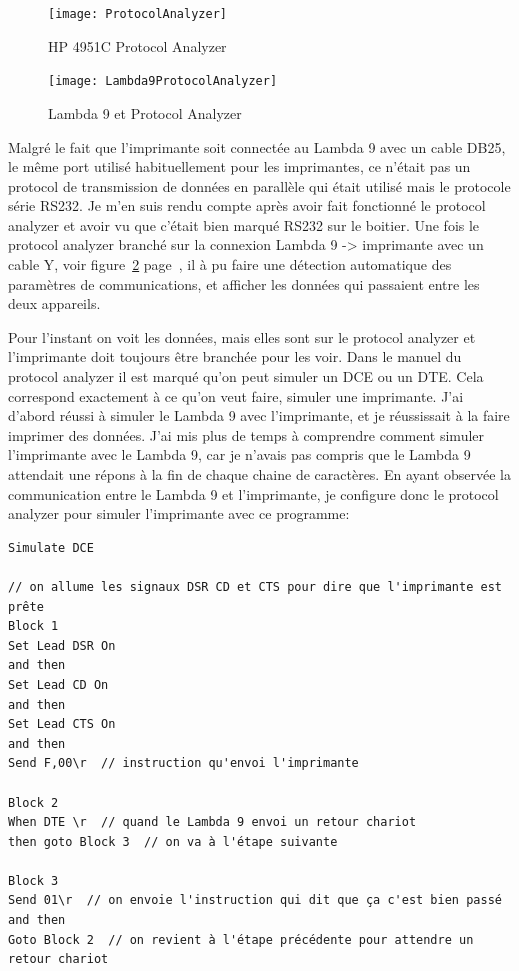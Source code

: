 \documentclass[12pt]{article}
\begin{document}
\begin{figure}[h]
	\centering
	\texttt{[image: ProtocolAnalyzer]}
	\caption{HP 4951C Protocol Analyzer}
	\label{fig:protocolAnalyzer}
\end{figure}

\begin{figure}[h]
	\centering
	\texttt{[image: Lambda9ProtocolAnalyzer]}
	\caption{Lambda 9 et Protocol Analyzer}
	\label{fig:lambda9HP}
\end{figure}


Malgré le fait que l'imprimante soit connectée au Lambda 9 avec un cable DB25, le même port utilisé habituellement pour les imprimantes, ce n'était pas un protocol de transmission de données en parallèle qui était utilisé mais le protocole série RS232.
Je m'en suis rendu compte après avoir fait fonctionné le protocol analyzer et avoir vu que c'était bien marqué RS232 sur le boitier.
Une fois le protocol analyzer branché sur la connexion Lambda 9 -> imprimante avec un cable Y, voir figure~\ref{fig:lambda9HP} page~\pageref{fig:lambda9HP}, il à pu faire une détection automatique des paramètres de communications, et afficher les données qui passaient entre les deux appareils.

Pour l'instant on voit les données, mais elles sont sur le protocol analyzer et l'imprimante doit toujours être branchée pour les voir.
Dans le manuel du protocol analyzer il est marqué qu'on peut simuler un DCE ou un DTE.
Cela correspond exactement à ce qu'on veut faire, simuler une imprimante.
J'ai d'abord réussi à simuler le Lambda 9 avec l'imprimante, et je réussissait à la faire imprimer des données.
J'ai mis plus de temps à comprendre comment simuler l'imprimante avec le Lambda 9, car je n'avais pas compris que le Lambda 9 attendait une répons à la fin de chaque chaine de caractères.
En ayant observée la communication entre le Lambda 9 et l'imprimante, je configure donc le protocol analyzer pour simuler l'imprimante avec ce programme:

\begin{lstlisting}
Simulate DCE

// on allume les signaux DSR CD et CTS pour dire que l'imprimante est prête
Block 1
Set Lead DSR On
and then
Set Lead CD On
and then
Set Lead CTS On
and then
Send F,00\r  // instruction qu'envoi l'imprimante

Block 2
When DTE \r  // quand le Lambda 9 envoi un retour chariot
then goto Block 3  // on va à l'étape suivante

Block 3
Send 01\r  // on envoie l'instruction qui dit que ça c'est bien passé
and then
Goto Block 2  // on revient à l'étape précédente pour attendre un retour chariot
\end{lstlisting}
\end{document}

